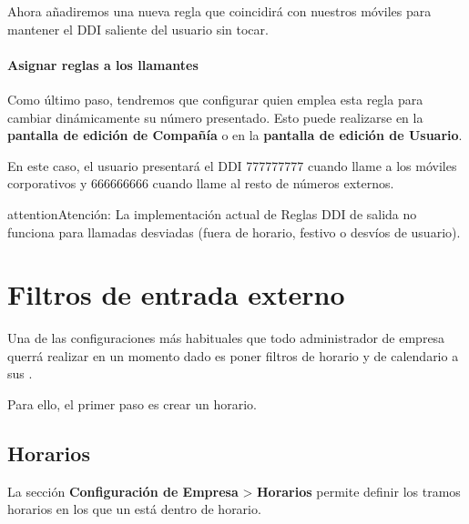 \documentclass[letterpaper,10pt,spanish]{sphinxmanual}
\begin{document}
Ahora añadiremos una nueva regla que coincidirá con nuestros móviles para mantener el DDI saliente del usuario sin tocar.

\paragraph{Asignar reglas a los llamantes}

Como último paso, tendremos que configurar quien emplea esta regla para cambiar dinámicamente su número presentado. Esto puede realizarse en la \textbf{pantalla de edición de Compañía} o en la \textbf{pantalla de edición de Usuario}.


En este caso, el usuario presentará el DDI 777777777 cuando llame a los móviles corporativos y 666666666 cuando llame al resto de números externos.

\begin{notice}{attention}{Atención:}
La implementación actual de Reglas DDI de salida no funciona para llamadas desviadas (fuera de horario, festivo o desvíos de usuario).
\end{notice}


\section{Filtros de entrada externo}
\label{pbx_features/external_filters:external-call-filters}\label{pbx_features/external_filters:external-filters}\label{pbx_features/external_filters::doc}
Una de las configuraciones más habituales que todo administrador de empresa querrá realizar en un momento dado es poner filtros de horario y de calendario a sus {\hyperref[pbx_features/external_ddis:external\string-ddis]{}}.

Para ello, el primer paso es crear un horario.


\subsection{Horarios}
\label{pbx_features/external_filters:schedules}
La sección \textbf{Configuración de Empresa} \textgreater{} \textbf{Horarios} permite definir los tramos horarios en los que un {\hyperref[pbx_features/external_ddis:external\string-ddis]{}} está dentro de horario.
\end{document}
